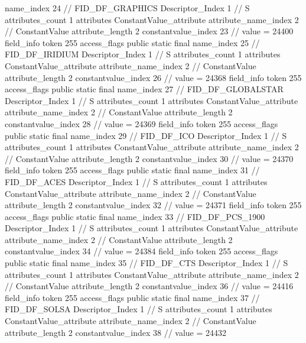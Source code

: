 {{{{{				name_index	24		// FID_DF_GRAPHICS
				Descriptor_Index	1		// S
				attributes_count	1
				attributes {
				ConstantValue_attribute {
					attribute_name_index	2		// ConstantValue
					attribute_length	2
					constantvalue_index	23		// value = 24400
				}
				}
			}
			field_info {
				token	255
				access_flags	public static final
				name_index	25		// FID_DF_IRIDIUM
				Descriptor_Index	1		// S
				attributes_count	1
				attributes {
				ConstantValue_attribute {
					attribute_name_index	2		// ConstantValue
					attribute_length	2
					constantvalue_index	26		// value = 24368
				}
				}
			}
			field_info {
				token	255
				access_flags	public static final
				name_index	27		// FID_DF_GLOBALSTAR
				Descriptor_Index	1		// S
				attributes_count	1
				attributes {
				ConstantValue_attribute {
					attribute_name_index	2		// ConstantValue
					attribute_length	2
					constantvalue_index	28		// value = 24369
				}
				}
			}
			field_info {
				token	255
				access_flags	public static final
				name_index	29		// FID_DF_ICO
				Descriptor_Index	1		// S
				attributes_count	1
				attributes {
				ConstantValue_attribute {
					attribute_name_index	2		// ConstantValue
					attribute_length	2
					constantvalue_index	30		// value = 24370
				}
				}
			}
			field_info {
				token	255
				access_flags	public static final
				name_index	31		// FID_DF_ACES
				Descriptor_Index	1		// S
				attributes_count	1
				attributes {
				ConstantValue_attribute {
					attribute_name_index	2		// ConstantValue
					attribute_length	2
					constantvalue_index	32		// value = 24371
				}
				}
			}
			field_info {
				token	255
				access_flags	public static final
				name_index	33		// FID_DF_PCS_1900
				Descriptor_Index	1		// S
				attributes_count	1
				attributes {
				ConstantValue_attribute {
					attribute_name_index	2		// ConstantValue
					attribute_length	2
					constantvalue_index	34		// value = 24384
				}
				}
			}
			field_info {
				token	255
				access_flags	public static final
				name_index	35		// FID_DF_CTS
				Descriptor_Index	1		// S
				attributes_count	1
				attributes {
				ConstantValue_attribute {
					attribute_name_index	2		// ConstantValue
					attribute_length	2
					constantvalue_index	36		// value = 24416
				}
				}
			}
			field_info {
				token	255
				access_flags	public static final
				name_index	37		// FID_DF_SOLSA
				Descriptor_Index	1		// S
				attributes_count	1
				attributes {
				ConstantValue_attribute {
					attribute_name_index	2		// ConstantValue
					attribute_length	2
					constantvalue_index	38		// value = 24432
				}
}}}}}}
